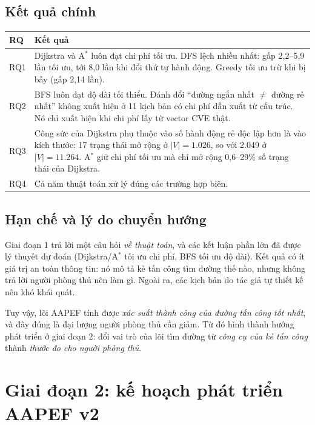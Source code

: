 \documentclass[11pt,a4paper]{article}
\begin{document}
\subsection{Kết quả chính}

\begin{center}
\begin{tabular}{@{}Y{1.4cm}Y{13.6cm}@{}}
\toprule
RQ & Kết quả \\
\midrule
RQ1 & Dijkstra và A$^{*}$ luôn đạt chi phí tối ưu. DFS lệch nhiều nhất: gấp 2,2--5,9 lần tối ưu, tới 8,0 lần khi đổi thứ tự hành động. Greedy tối ưu trừ khi bị bẫy (gấp 2,14 lần). \\
RQ2 & BFS luôn đạt độ dài tối thiểu. Đánh đổi ``đường ngắn nhất $\neq$ đường rẻ nhất'' không xuất hiện ở 11 kịch bản có chi phí dẫn xuất từ cấu trúc. Nó chỉ xuất hiện khi chi phí lấy từ vector CVE thật. \\
RQ3 & Công sức của Dijkstra phụ thuộc vào số hành động rẻ độc lập hơn là vào kích thước: 17 trạng thái mở rộng ở $|V| = 1.026$, so với 2.049 ở $|V| = 11.264$. A$^{*}$ giữ chi phí tối ưu mà chỉ mở rộng 0,6--29\% số trạng thái của Dijkstra. \\
RQ4 & Cả năm thuật toán xử lý đúng các trường hợp biên. \\
\bottomrule
\end{tabular}
\end{center}

\subsection{Hạn chế và lý do chuyển hướng}

Giai đoạn 1 trả lời một câu hỏi \emph{về thuật toán}, và các kết luận phần lớn đã được lý thuyết dự đoán (Dijkstra/A$^{*}$ tối ưu chi phí, BFS tối ưu độ dài). Kết quả có ít giá trị an toàn thông tin: nó mô tả kẻ tấn công tìm đường thế nào, nhưng không trả lời người phòng thủ nên làm gì. Ngoài ra, các kịch bản do tác giả tự thiết kế nên khó khái quát.

Tuy vậy, lõi AAPEF tính được \emph{xác suất thành công của đường tấn công tốt nhất}, và đây đúng là đại lượng người phòng thủ cần giảm. Từ đó hình thành hướng phát triển ở giai đoạn 2: đổi vai trò của lõi tìm đường từ \emph{công cụ của kẻ tấn công} thành \emph{thước đo cho người phòng thủ}.

\section{Giai đoạn 2: kế hoạch phát triển AAPEF v2}
\end{document}
